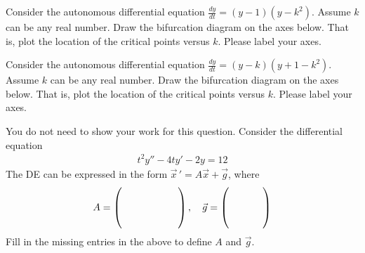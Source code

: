 \ifnum {}  
\question[2] Consider the autonomous differential equation $\displaystyle \frac{dy}{dt}= (y-1)(y-k^2)$.  Assume $k$ can be any real number. Draw the bifurcation diagram on the axes below. That is, plot the location of the critical points versus $k$. Please label your axes.
        \begin{center}
        \end{center}
\fi

\ifnum {}
\question[2] Consider the autonomous differential equation $\displaystyle \frac{dy}{dt}= (y-k)(y+1-k^2)$.  Assume $k$ can be any real number. Draw the bifurcation diagram on the axes below. That is, plot the location of the critical points versus $k$. Please label your axes.
        \begin{center}
        \end{center}
\fi

\ifnum {}
    \question[2] You do not need to show your work for this question. Consider the differential equation 
    \begin{align*}
        t^2y'' - 4ty' - 2y = 12
    \end{align*}
    The DE can be expressed in the form $\vec x\, ' = A\vec x + \vec g$, where 
    \begin{align*}
     A = \left( \hbox to 2cm{\vbox to 0.85cm{}} \right), \quad \vec g = \left( \hbox to 1.2cm{\vbox to 0.85cm{}} \right)
    \end{align*}
    Fill in the missing entries in the above to define $A$ and $\vec g$. 
\fi

